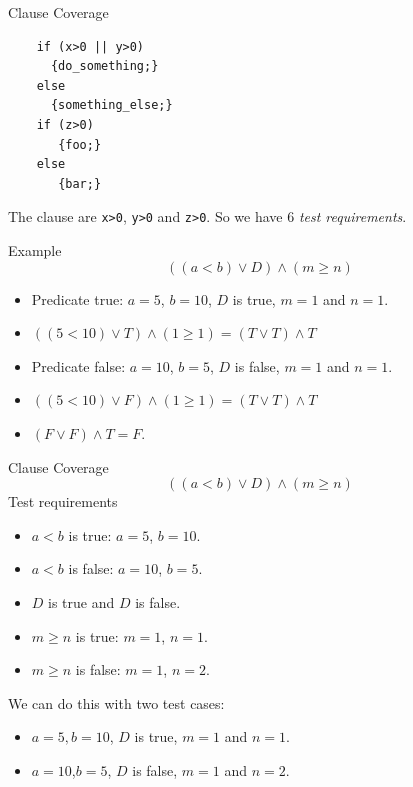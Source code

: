 \documentclass{beamer}
\begin{document}
\begin{frame}[fragile]{Clause Coverage}
  \begin{lstlisting}
    if (x>0 || y>0) 
      {do_something;} 
    else
      {something_else;}
    if (z>0) 
       {foo;}
    else
       {bar;}
  \end{lstlisting}
The clause are \verb+x>0+, \verb+y>0+ and  \verb+z>0+.  So we have 6
{\it test requirements}. 
\end{frame}
\begin{frame}{Example}
\[
((a<b) \lor D) \land (m \geq n)
\]
\begin{itemize}
\item Predicate true: $a=5$, $b=10$, $D$ is true, $m=1$ and $n=1$.
\item $((5<10) \lor T) \land (1 \geq 1) = (T \lor T )\land T$
\end{itemize}

\begin{itemize}
\item Predicate false: $a=10$, $b=5$, $D$ is false, $m=1$ and $n=1$.
\item $((5<10) \lor F) \land (1 \geq 1) = (T \lor T )\land T$
\item $(F \lor F) \land T = F$.
\end{itemize}

\end{frame}
\begin{frame}{Clause Coverage}
\[
((a<b) \lor D) \land (m \geq n)
\]
Test requirements 
\begin{itemize}
\item $a<b$ is true: $a=5$, $b=10$.
\item $a<b$ is false: $a=10$, $b=5$.
\item $D$ is true and $D$ is false.
\item $m\geq n$ is true: $m=1$, $n=1$.
\item $m\geq n$ is false: $m=1$, $n=2$.
\end{itemize}
We can do this with two test cases:
\begin{itemize}
\item $a=5, b=10$, $D$ is true, $m=1$ and $n=1$. 
\item $a=10$,$b=5$, $D$ is false, $m=1$ and $n=2$.
\end{itemize}
  
\end{frame}
\end{document}
